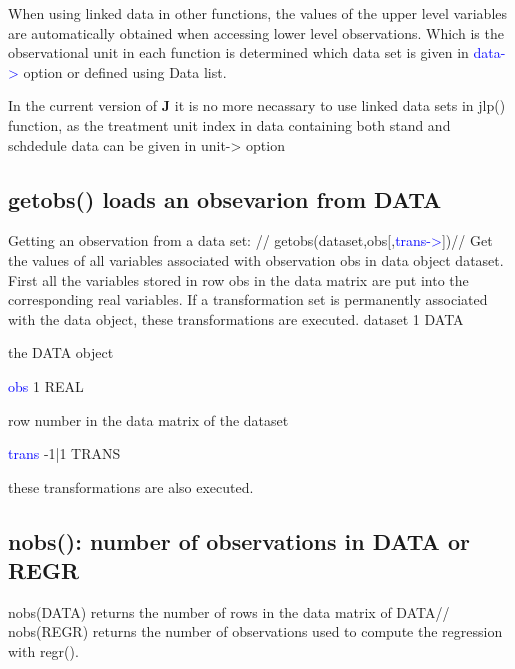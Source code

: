 \begin{note}
When using linked data in other functions, the values of the upper level variables are
automatically obtained when accessing lower level observations. Which is the observational
unit in each function is determined which data set is given in \textcolor{blue}{data->} option or defined using
Data list.
\end{note}
\begin{note}
In the current version of \textbf{J} it is no more necassary to use linked data sets in
\textcolor{VioletRed}{jlp}() function, as the treatment unit index in data containing both
stand and schdedule data can be given in unit-> option
\end{note}
\subsection{\textcolor{VioletRed}{getobs}() loads an obsevarion from  DATA}
\label{getobs}
Getting an observation from a data set: //
\textcolor{VioletRed}{getobs}(dataset,obs[,\textcolor{blue}{trans->}])//
Get the values of all variables associated with observation obs in data object dataset. First all the
variables stored in row obs in the data matrix are put into the corresponding real variables. If
a transformation set is permanently associated with the data object, these transformations are
executed.
\vspace{0.3cm}
\hline
\vspace{0.3cm}
\noindent dataset \tabto{3cm} 1 \tabto{5cm}  DATA  \tabto{7cm}
\begin{changemargin}{3cm}{0cm}
\noindent  the DATA object
\end{changemargin}
\vspace{0.3cm}
\hline
\vspace{0.3cm}
\noindent \textcolor{blue}{obs}  \tabto{3cm} 1 \tabto{5cm}   REAL \tabto{7cm}
\begin{changemargin}{3cm}{0cm}
\noindent  row number in the data matrix of the dataset
\end{changemargin}
\vspace{0.3cm}
\hline
\vspace{0.3cm}
\noindent \textcolor{blue}{trans} \tabto{3cm} -1|1  \tabto{5cm}   TRANS  \tabto{7cm}
\begin{changemargin}{3cm}{0cm}
\noindent  these transformations are also executed.
\end {changemargin}
\hline
\vspace{0.2cm}
\subsection{\textcolor{VioletRed}{nobs}(): number of observations in DATA or REGR}
\label{nobs}
\textcolor{VioletRed}{nobs}(DATA) returns the number of rows in the data matrix of DATA//
\textcolor{VioletRed}{nobs}(REGR) returns the number of observations used to compute
the regression with \textcolor{VioletRed}{regr}().
